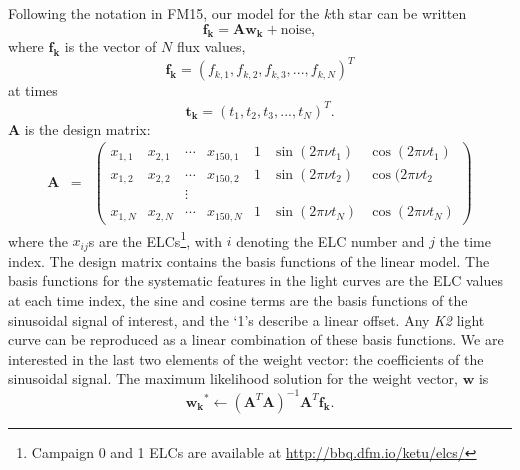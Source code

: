 Following the notation in FM15, our model for the $k$th star can be written
\begin{equation}
	\mathbf{f_k} = \mathbf{A}\mathbf{w_k} + \mathrm{noise},
\end{equation}
where $\mathbf{f_k}$ is the vector of $N$ flux values,
\begin{equation}
	\mathbf{f_k} = (f_{k,1}, f_{k,2}, f_{k,3}, ..., f_{k,N})^T
\end{equation}
at times
\begin{equation}
	\mathbf{t_k} = (t_1, t_2, t_3, ..., t_N)^T.
\end{equation}
$\mathbf{A}$ is the design matrix:
\begin{eqnarray}
	\mathbf{A} &=& \left (\begin{array}{ccccccc}
	x_{1,1} & x_{2,1} & \cdots & x_{150,1} & 1 & \sin(2\pi\nu t_1) & \cos(2\pi\nu t_1) \\
	x_{1,2} & x_{2,2} & \cdots & x_{150,2} & 1 & \sin(2\pi\nu t_2) & \cos(2\pi\nu t_2\\
    && \vdots &&&\\
	x_{1,N} & x_{2,N} & \cdots & x_{150,N} & 1 & \sin(2\pi\nu t_N) & \cos(2\pi\nu t_N)
\end{array}\right )
\end{eqnarray}
where the $x_{ij}$s are the ELCs\footnote{Campaign 0 and 1 ELCs are
available at \url{http://bbq.dfm.io/ketu/elcs/}}, with $i$ denoting the ELC number
and $j$ the time index.
The design matrix contains the basis functions of the linear model.
The basis functions for the systematic features in the light curves are the ELC
values at each time index, the sine and cosine terms are the basis functions of
the sinusoidal signal of interest, and the `1's describe a linear offset.
Any {\it K2} light curve can be reproduced as a linear combination of these
basis functions.
We are interested in the last two elements of the weight vector: the
coefficients of the sinusoidal signal.
The maximum likelihood solution for the weight vector,
$\mathbf{w}$ is
\begin{equation}
	\mathbf{w_k}^* \gets (\mathbf{A}^T\mathbf{A})^{-1}\mathbf{A}^T\mathbf{f_k}.
\end{equation}

